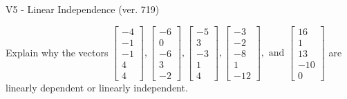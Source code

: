 \begin{exercise}
  \begin{exerciseTitle}V5 - Linear Independence (ver. 719)\end{exerciseTitle}
  \begin{exerciseStatement}
    Explain why the vectors \(\left[\begin{array}{r}
-4 \\
-1 \\
-1 \\
4 \\
4
\end{array}\right] , \left[\begin{array}{r}
-6 \\
0 \\
-6 \\
3 \\
-2
\end{array}\right] , \left[\begin{array}{r}
-5 \\
3 \\
-3 \\
1 \\
4
\end{array}\right] , \left[\begin{array}{r}
-3 \\
-2 \\
-8 \\
1 \\
-12
\end{array}\right] , \text{ and } \left[\begin{array}{r}
16 \\
1 \\
13 \\
-10 \\
0
\end{array}\right]\) are linearly dependent or linearly independent.	



\end{exerciseStatement}
\end{exercise}
